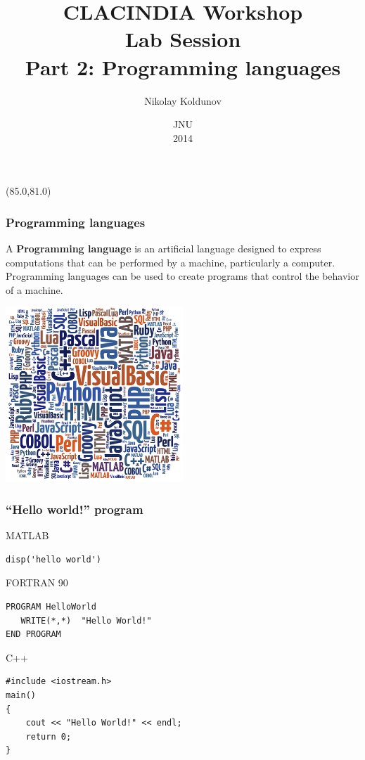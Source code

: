 \documentclass{beamer}
\title{CLACINDIA Workshop \\
Lab Session\\
       Part 2:  Programming languages}
\author{Nikolay Koldunov}
\date{JNU\\
       2014}
\newcommand{\MyLogo}{%
\begin{textblock}{14}(85.0,81.0)
  \pgfuseimage{logo}
\end{textblock}
}
\begin{document}
\begin{frame}
\titlepage
\MyLogo
\end{frame}


\begin{frame}[fragile]
\frametitle{Programming languages}

A \textbf{Programming language} is an artificial language designed to express computations that can be performed by a machine, particularly a computer. Programming languages can be used to create programs that control the behavior of a machine.
\begin{center}
\includegraphics[width=0.5\textwidth,angle=00]{languages.jpg}
\end{center}
\end{frame}

\begin{frame}[fragile]
\frametitle{``Hello world!'' program}

\begin{block}{MATLAB}
  \begin{lstlisting}
disp('hello world')
  \end{lstlisting}
\end{block}

\pause

\begin{block}{FORTRAN 90}
  \begin{lstlisting}
PROGRAM HelloWorld
   WRITE(*,*)  "Hello World!"
END PROGRAM
  \end{lstlisting}
\end{block}

\pause

\begin{block}{C++}
  \begin{lstlisting}
#include <iostream.h>
main()
{
    cout << "Hello World!" << endl;
    return 0;
}
  \end{lstlisting}
\end{block}


\end{frame}
\end{document}
